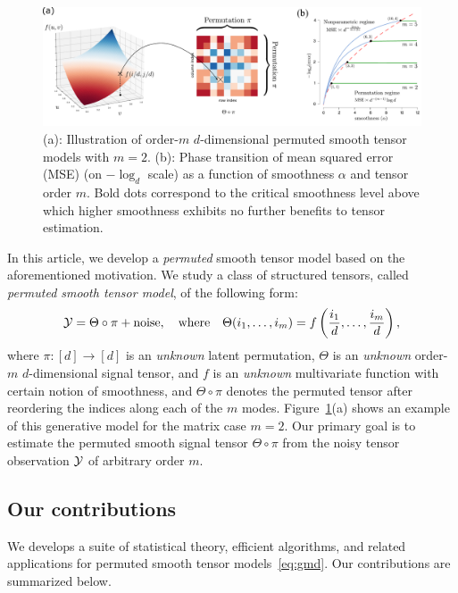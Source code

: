 \documentclass[12pt]{article}
\theoremstyle{definition}
\begin{document}
\begin{figure}[ht]
    \centering
    \includegraphics[width = .95\textwidth]{figure/semantic_new.pdf}
    \caption{(a): Illustration of order-$m$ $d$-dimensional permuted smooth tensor models with $m=2$. (b): Phase transition of mean squared error (MSE) (on $-\log_d$ scale) as a function of smoothness $\alpha$ and tensor order $m$. Bold dots correspond to the critical smoothness level above which higher smoothness exhibits no further benefits to tensor estimation. }
    \label{fig:rate}
\end{figure}


In this article, we develop a \emph{permuted} smooth tensor model based on the aforementioned  motivation. We study a class of structured tensors, called \emph{permuted smooth tensor model}, of the following form:
\begin{align}\label{eq:gmd}
    \mathcal{Y} = \Theta\circ \pi + \text{noise}, \quad \text{where}\quad \Theta(i_1,\ldots,i_m)=f\left({i_1\over d},\ldots,{i_m\over d}\right),
\end{align}
where $\pi\colon[d]\rightarrow[d]$ is an \emph{unknown} latent permutation, $\Theta$ is an \emph{unknown} order-$m$ $d$-dimensional signal tensor, and $f$ is an \emph{unknown} multivariate function with certain notion of smoothness, and $\Theta \circ \pi $ denotes the permuted tensor after reordering the indices along each of the $m$ modes. Figure~\ref{fig:rate}(a) shows an example of this generative model for the matrix case $m=2$. Our primary goal is to estimate the permuted smooth signal tensor $\Theta \circ \pi$ from the noisy tensor observation $\mathcal{Y}$ of arbitrary order $m$. 


\subsection{Our contributions}
We develops a suite of statistical theory, efficient algorithms, and related applications for permuted smooth tensor models~\eqref{eq:gmd}.  
Our contributions are summarized below. 
\end{document}
